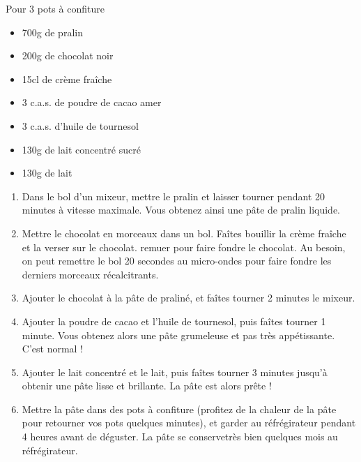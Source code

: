 \bigskip
{}
{Pour 3 pots à confiture}{\begin{itemize}
	\item 700g de pralin
	\item 200g de chocolat noir
	\item 15cl de crème fraîche
	\item 3 c.a.s. de poudre de cacao amer
	\item 3 c.a.s. d'huile de tournesol
	\item 130g de lait concentré sucré
	\item 130g de lait
\end{itemize}}
{\begin{enumerate}
	\item Dans le bol d'un mixeur, mettre le pralin et laisser tourner pendant 20 minutes à vitesse maximale. Vous obtenez ainsi une pâte de pralin liquide.
	\item Mettre le chocolat en morceaux dans un bol. Faîtes bouillir la crème fraîche et la verser sur le chocolat. remuer pour faire fondre le chocolat. Au besoin, on peut remettre le bol 20 secondes au micro-ondes pour faire fondre les derniers morceaux récalcitrants. 
	\item Ajouter le chocolat à la pâte de praliné, et faîtes tourner 2 minutes le mixeur.
	\item Ajouter la poudre de cacao et l'huile de tournesol, puis faîtes tourner 1 minute. Vous obtenez alors une pâte grumeleuse et pas très appétissante. C'est normal !
	\item Ajouter le lait concentré et le lait, puis faîtes tourner 3 minutes jusqu'à obtenir une pâte lisse et brillante. La pâte est alors prête !
	\item Mettre la pâte dans des pots à confiture (profitez de la chaleur de la pâte pour retourner vos pots quelques minutes), et garder au réfrégirateur pendant 4 heures avant de déguster. La pâte se conservetrès bien quelques mois au réfrégirateur.
\end{enumerate}
}

\bigskip


